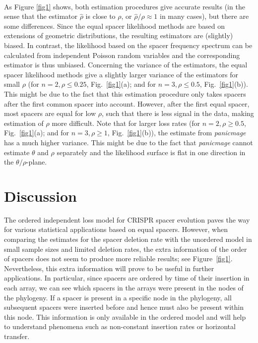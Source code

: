 \documentclass[preprint,authoryear]{elsarticle}
\theoremstyle{definition}
\numberwithin{equation}{section}
\numberwithin{figure}{section}
\begin{document}
~

As Figure \ref{fig1} shows, both estimation procedures give accurate
results (in the sense that the estimator $\hat\rho$ is close to
$\rho$, or $\hat\rho/\rho\approx 1$ in many cases), but there are some
differences. Since the equal spacer likelihood methods are based on
extensions of geometric distributions, the resulting estimators are
(slightly) biased. In contrast, the likelihood based on the spacer
frequency spectrum can be calculated from independent Poisson random
variables \citep{BaumdickerHessPfaffelhuber2010} and the corresponding estimator is thus unbiased.
Concerning the variance of the estimators, the equal spacer likelihood
methods give a slightly larger variance of the estimators for small
$\rho$ (for $n=2, \rho\leq0.25$, Fig.~\ref{fig1}(a); and for $n=3, \rho\leq0.5$, Fig.~\ref{fig1}(b)).
This might be due to the fact that this estimation procedure
only takes spacers after the first common spacer into
account. However, after the first equal spacer, most spacers are
equal for low $\rho$, such that there is less signal in the data, making estimation of $\rho$ more difficult.
Note that for larger loss rates (for $n=2, \rho\geq0.5$, Fig.~\ref{fig1}(a); and for $n=3, \rho\geq1$, Fig.~\ref{fig1}(b)), 
the estimate from {\em panicmage} has a much higher
variance. This might be due to the fact that {\em panicmage} cannot
estimate $\theta$ and $\rho$ separately and the likelihood surface is
flat in one direction in the $\theta/\rho$-plane.

\section{Discussion} 
\label{S:5}

The ordered independent loss model for CRISPR spacer evolution paves
the way for various statistical applications based on equal
spacers. However, when comparing the estimates for the spacer deletion rate with the unordered model in small sample sizes and limited deletion rates, the extra information 
of the order of spacers does not seem to produce more reliable results; see
Figure~\ref{fig1}. Nevertheless, this extra information will prove to be useful
in further applications. In particular, since spacers are ordered by time of their insertion in each
array, we can see which spacers in the arrays were present in the nodes of the phylogeny. If a
spacer is present in a specific node in the phylogeny, all subsequent
spacers were inserted before and hence must also be present within this
node. This information is only available in the ordered model and will help to understand
phenomena such as non-constant insertion rates or horizontal transfer.
\end{document}
